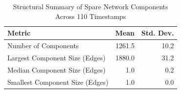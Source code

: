 \begin{table}[htbp]
\centering
\caption{Structural Summary of Spare Network Components Across 110 Timestamps}
\label{tab:contiguity_structural_summary}
\begin{tabular}{lrr}
\toprule
Metric & Mean & Std. Dev. \\
\midrule
Number of Components & 1261.5 & 10.2 \\
Largest Component Size (Edges) & 1880.0 & 31.2 \\
Median Component Size (Edges) & 1.0 & 0.2 \\
Smallest Component Size (Edges) & 1.0 & 0.0 \\
\bottomrule
\end{tabular}
\end{table}
